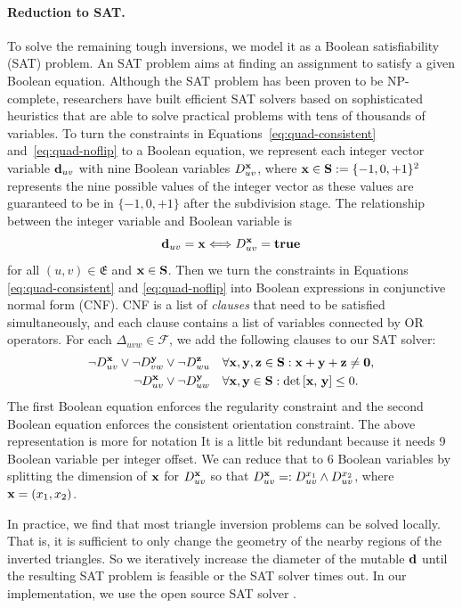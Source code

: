 \paragraph*{Reduction to SAT.}
To solve the remaining tough inversions,  we model it as a Boolean satisfiability (SAT) problem.  An SAT problem aims at finding an assignment to satisfy a given Boolean equation.  Although the SAT problem has been proven to be NP-complete, researchers have built efficient SAT solvers based on sophisticated heuristics that are able to solve practical problems with tens of thousands of variables.  To turn the constraints in Equations~\eqref{eq:quad-consistent} and~\eqref{eq:quad-noflip} to a Boolean equation, we represent each integer vector variable ${\mathbf{d}}_{uv}$ with nine Boolean variables $D^{\mathbf{x}}_{uv}$, where $\mathbf{x} \in \mathbf{S} := \{-1, 0, +1\}^2$ represents the nine possible values of the integer vector as these values are guaranteed to be in $\{-1, 0, +1\}$ after the subdivision stage.  The relationship between the integer variable and Boolean variable is
\[
{\mathbf{d}}_{uv}=\mathbf{x} \Longleftrightarrow D^{\mathbf{x}}_{uv}= \mathbf{true}
\]
for all $(u,v)\in\mathfrak{E}$ and $\mathbf{x} \in \mathbf{S}$.  Then we turn the constraints in Equations \eqref{eq:quad-consistent} and \eqref{eq:quad-noflip} into Boolean expressions in conjunctive normal form (CNF). CNF is a list of \emph{clauses} that need to be satisfied simultaneously, and each clause contains a list of variables connected by OR operators.  For each $\Delta_{uvw} \in \mathcal{F}$, we add the following clauses to our SAT solver: 
\begin{align*}
\lnot D^{\mathbf{x}}_{uv} \lor \lnot D^{\mathbf{y}}_{vw} \lor \lnot D^{\mathbf{z}}_{wu} \quad &\forall \mathbf{x},\mathbf{y},\mathbf{z}\in {\mathbf{S}}:\mathbf{x}+\mathbf{y}+\mathbf{z}\ne \mathbf{0}, \\
\lnot D^{\mathbf{x}}_{uv} \lor \lnot D^{\mathbf{y}}_{uw} \quad &\forall \mathbf{x},\mathbf{y}\in {\mathbf{S}}: \mathrm{det} \left[ \mathbf{x},\, \mathbf{y} \right] \le 0.
\end{align*}
The first Boolean equation enforces the regularity constraint and the second Boolean equation enforces the consistent orientation constraint.  The above representation is more for notation It is a little bit redundant because it needs 9 Boolean variable per integer offset.  We can reduce that to 6 Boolean variables by splitting the dimension of $\mathbf{x}$ for $D^{\mathbf{x}}_{uv}$ so that $D^{\mathbf{x}}_{uv}=:D^{x_1}_{uv}\land D^{x_2}_{uv}$, where $\mathbf{x}=(x_1, x_2)$.

In practice, we find that most triangle inversion problems can be solved locally. That is, it is sufficient to only change the geometry of the nearby regions of the inverted triangles.  So we iteratively increase the diameter of the mutable ${\mathbf{d}}$ until the resulting SAT problem is feasible or the SAT solver times out.  In our implementation, we use the open source SAT solver \cite{liang2016learning}.  %

